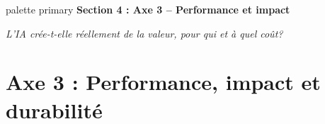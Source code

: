\documentclass[aspectratio=169,11pt]{beamer}
\begin{document}
\begin{frame}{}
  \begin{beamercolorbox}[wd=\paperwidth,ht=2.5cm,dp=0.5cm,center]{palette primary}
    {\Large\bfseries Section 4 : Axe 3 -- Performance et impact}
  \end{beamercolorbox}
  \vspace{2cm}
  \begin{center}
    {\large\textit{L'IA crée-t-elle réellement de la valeur, pour qui et à quel coût?}}
  \end{center}
\end{frame}

\section{Axe 3 : Performance, impact et durabilité}
\end{document}
